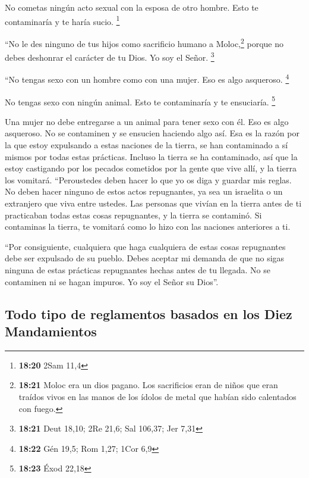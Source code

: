  No cometas ningún acto sexual con la esposa de otro
hombre. Esto te contaminaría y te haría sucio. \footnote{\textbf{18:20}
  2Sam 11,4}

 ``No le des ninguno de tus hijos como sacrificio humano
a Moloc,\footnote{\textbf{18:21} Moloc era un dios pagano. Los
  sacrificios eran de niños que eran traídos vivos en las manos de los
  ídolos de metal que habían sido calentados con fuego.} porque no debes
deshonrar el carácter de tu Dios. Yo soy el Señor. \footnote{\textbf{18:21}
  Deut 18,10; 2Re 21,6; Sal 106,37; Jer 7,31}

 ``No tengas sexo con un hombre como con una mujer. Eso
es algo asqueroso. \footnote{\textbf{18:22} Gén 19,5; Rom 1,27; 1Cor 6,9}

 No tengas sexo con ningún animal. Esto te contaminaría y
te ensuciaría. \footnote{\textbf{18:23} Éxod 22,18}

 Una mujer no debe entregarse a un animal para tener sexo
con él. Eso es algo asqueroso. No se contaminen y se ensucien haciendo
algo así. Esa es la razón por la que estoy expulsando a estas naciones
de la tierra, se han contaminado a sí mismos por todas estas prácticas.
 Incluso la tierra se ha contaminado, así que la estoy
castigando por los pecados cometidos por la gente que vive allí, y la
tierra los vomitará.  ``Peroustedes deben hacer lo que yo
os diga y guardar mis reglas. No deben hacer ninguno de estos actos
repugnantes, ya sea un israelita o un extranjero que viva entre ustedes.
 Las personas que vivían en la tierra antes de ti
practicaban todas estas cosas repugnantes, y la tierra se contaminó.
 Si contaminas la tierra, te vomitará como lo hizo con
las naciones anteriores a ti.

 ``Por consiguiente, cualquiera que haga cualquiera de
estas cosas repugnantes debe ser expulsado de su pueblo. 
Debes aceptar mi demanda de que no sigas ninguna de estas prácticas
repugnantes hechas antes de tu llegada. No se contaminen ni se hagan
impuros. Yo soy el Señor su Dios''.

\hypertarget{todo-tipo-de-reglamentos-basados-en-los-diez-mandamientos}{%
\subsection{Todo tipo de reglamentos basados \hspace{0pt}\hspace{0pt}en
los Diez
Mandamientos}\label{todo-tipo-de-reglamentos-basados-en-los-diez-mandamientos}}

